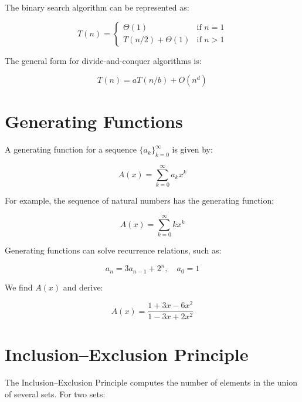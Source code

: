 \documentclass{article}
\begin{document}
    The binary search algorithm can be represented as:

    \begin{equation}
        T(n) =
        \begin{cases}
            \Theta(1) & \text{if } n = 1 \\
            T(n/2) + \Theta(1) & \text{if } n > 1
        \end{cases}
    \end{equation}

    The general form for divide-and-conquer algorithms is:

    \begin{equation}
        T(n) = aT(n/b) + O(n^d)
    \end{equation}

    \section{Generating Functions}
    A generating function for a sequence $\{a_k\}_{k=0}^{\infty}$ is given by:

    \begin{equation}
        A(x) = \sum_{k=0}^{\infty} a_k x^k
    \end{equation}

    For example, the sequence of natural numbers has the generating function:

    \begin{equation}
        A(x) = \sum_{k=0}^{\infty} kx^k
    \end{equation}

    Generating functions can solve recurrence relations, such as:

    \begin{equation}
        a_n = 3a_{n-1} + 2^n, \quad a_0 = 1
    \end{equation}

    We find $A(x)$ and derive:

    \begin{equation}
        A(x) = \frac{1 + 3x - 6x^2}{1 - 3x + 2x^2}
    \end{equation}

    \section{Inclusion–Exclusion Principle}
    The Inclusion–Exclusion Principle computes the number of elements in the union of several sets. For two sets:
\end{document}
